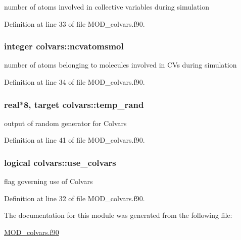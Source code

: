 number of atoms involved in collective variables during simulation 



Definition at line 33 of file M\-O\-D\-\_\-colvars.\-f90.

\hypertarget{classcolvars_add268966bff91c6c344e0c05452249ae}{
\subsubsection[{ncvatomsmol}]{\setlength{\rightskip}{0pt plus 5cm}integer colvars\-::ncvatomsmol}}\label{classcolvars_add268966bff91c6c344e0c05452249ae}


number of atoms belonging to molecules involved in C\-Vs during simulation 



Definition at line 34 of file M\-O\-D\-\_\-colvars.\-f90.

\hypertarget{classcolvars_a68f638ce8e5d585bbcf7d5c80887c3d2}{
\subsubsection[{temp\-\_\-rand}]{\setlength{\rightskip}{0pt plus 5cm}real$\ast$8, target colvars\-::temp\-\_\-rand}}\label{classcolvars_a68f638ce8e5d585bbcf7d5c80887c3d2}


output of random generator for Colvars 



Definition at line 41 of file M\-O\-D\-\_\-colvars.\-f90.

\hypertarget{classcolvars_ae0f77ac6f6f4c0af1a1f09458e30c145}{
\subsubsection[{use\-\_\-colvars}]{\setlength{\rightskip}{0pt plus 5cm}logical colvars\-::use\-\_\-colvars}}\label{classcolvars_ae0f77ac6f6f4c0af1a1f09458e30c145}


flag governing use of Colvars 



Definition at line 32 of file M\-O\-D\-\_\-colvars.\-f90.



The documentation for this module was generated from the following file\-:\begin{DoxyCompactItemize}
\item 
\hyperlink{MOD__colvars_8f90}{M\-O\-D\-\_\-colvars.\-f90}\end{DoxyCompactItemize}
